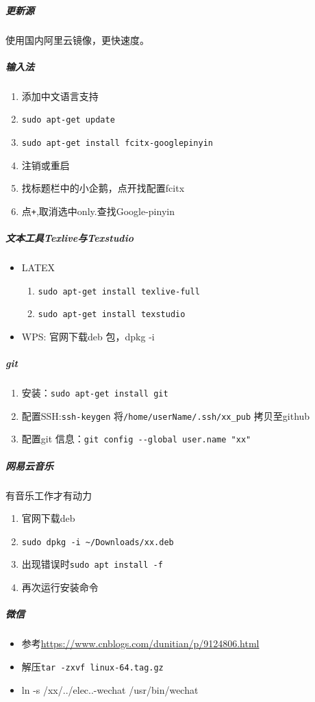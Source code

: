 \documentclass[UTF8,a4paper,12pt]{ctexbook}
\begin{document}
		\subparagraph{更新源}使用国内阿里云镜像，更快速度。

		\subparagraph{输入法}
			\begin{enumerate}[itemindent = 2em]
				\item 添加中文语言支持
				\item \verb|sudo apt-get update|
				\item \verb|sudo apt-get install fcitx-googlepinyin|
				\item 注销或重启
				\item 找标题栏中的小企鹅，点开找配置fcitx
				\item 点\verb|+|,取消选中only.查找Google-pinyin
			\end{enumerate}	
					
		\subparagraph{文本工具Texlive与Texstudio}
			\begin{itemize}[itemindent = 1em]
				\item LATEX
					\begin{enumerate}[itemindent = 1em]
						\item \verb|sudo apt-get install texlive-full|
						\item \verb|sudo apt-get install texstudio|
					\end{enumerate}
				\item WPS: 官网下载deb 包，dpkg -i
					
			\end{itemize}
			
		\subparagraph{git}	
			\begin{enumerate}[itemindent = 1em]
				\item 安装：\verb|sudo apt-get install git|
				\item 配置SSH:\verb|ssh-keygen| 将\verb|/home/userName/.ssh/xx_pub| 拷贝至github
				\item 配置git 信息：\verb|git config --global user.name "xx"|
			\end{enumerate}
			
			
		\subparagraph{网易云音乐}有音乐工作才有动力
			\begin{enumerate}[itemindent = 2em]
				\item 官网下载deb
				\item \verb|sudo dpkg -i ~/Downloads/xx.deb|
				\item 出现错误时\verb|sudo apt install -f|
				\item 再次运行安装命令
			\end{enumerate} 
		
		\subparagraph{微信}
			\begin{itemize}[itemindent = 1em]
				\item 参考\url{https://www.cnblogs.com/dunitian/p/9124806.html}
				\item 解压\verb|tar -zxvf linux-64.tag.gz|
				\item ln -s /xx/../elec..-wechat   /usr/bin/wechat 
			\end{itemize}
			
\end{document}
